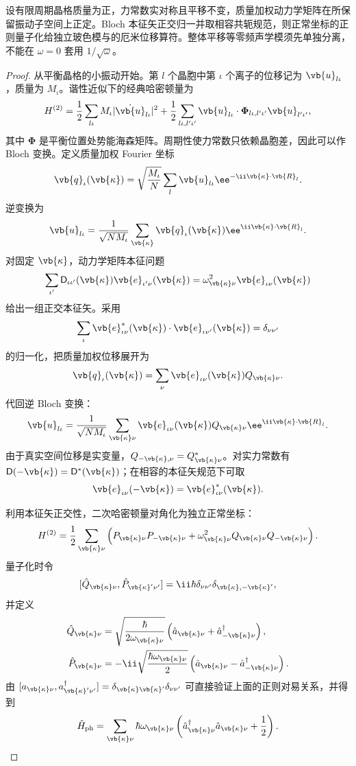 \begin{theorem}[周期谐性格的正交正常模量子化]
设有限周期晶格质量为正，力常数实对称且平移不变，质量加权动力学矩阵在所保留振动子空间上正定。Bloch 本征矢正交归一并取相容共轭规范，则正常坐标的正则量子化给独立玻色模与的厄米位移算符。整体平移等零频声学模须先单独分离，不能在 $\omega=0$ 套用 $1/\sqrt\omega$。
\end{theorem}
\begin{proof}
从平衡晶格的小振动开始。第 $l$ 个晶胞中第 $\iota$ 个离子的位移记为 $\vb{u}_{l\iota}$，质量为 $M_\iota$。谐性近似下的经典哈密顿量为
\[
H^{(2)}
=\frac12\sum_{l\iota}M_\iota|\dot{\vb{u}}_{l\iota}|^2
+\frac12\sum_{l\iota,l'\iota'}
\vb{u}_{l\iota}\cdot
\boldsymbol\Phi_{l\iota,l'\iota'}\vb{u}_{l'\iota'},
\]
其中 $\boldsymbol\Phi$ 是平衡位置处势能海森矩阵。周期性使力常数只依赖晶胞差，因此可以作 Bloch 变换。定义质量加权 Fourier 坐标
\[
\vb{q}_\iota(\vb{\kappa})
=\sqrt{\frac{M_\iota}{N}}
\sum_l\vb{u}_{l\iota}\ee^{-\ii\vb{\kappa}\cdot\vb{R}_l}.
\]
逆变换为
\[
\vb{u}_{l\iota}
=\frac1{\sqrt{NM_\iota}}
\sum_{\vb{\kappa}}
\vb{q}_\iota(\vb{\kappa})
\ee^{\ii\vb{\kappa}\cdot\vb{R}_l}.
\]
对固定 $\vb{\kappa}$，动力学矩阵本征问题
\[
\sum_{\iota'}\mathsf D_{\iota\iota'}(\vb{\kappa})
\vb{e}_{\iota'\nu}(\vb{\kappa})
=\omega_{\vb{\kappa}\nu}^2
\vb{e}_{\iota\nu}(\vb{\kappa})
\]
给出一组正交本征矢。采用
\[
\sum_\iota
\vb{e}_{\iota\nu}^*(\vb{\kappa})\cdot
\vb{e}_{\iota\nu'}(\vb{\kappa})
=\delta_{\nu\nu'}
\]
的归一化，把质量加权位移展开为
\[
\vb{q}_\iota(\vb{\kappa})
=\sum_\nu\vb{e}_{\iota\nu}(\vb{\kappa})
Q_{\vb{\kappa}\nu}.
\]
代回逆 Bloch 变换：
\[
\vb{u}_{l\iota}
=\frac1{\sqrt{NM_\iota}}
\sum_{\vb{\kappa}\nu}
\vb{e}_{\iota\nu}(\vb{\kappa})
Q_{\vb{\kappa}\nu}
\ee^{\ii\vb{\kappa}\cdot\vb{R}_l}.
\]
由于真实空间位移是实变量，$Q_{-\vb{\kappa},\nu}=Q_{\vb{\kappa}\nu}^*$。对实力常数有 $\mathsf D(-\vb{\kappa})=\mathsf D^*(\vb{\kappa})$；在相容的本征矢规范下可取
\[
\vb{e}_{\iota\nu}(-\vb{\kappa})
=\vb{e}_{\iota\nu}^*(\vb{\kappa}).
\]

利用本征矢正交性，二次哈密顿量对角化为独立正常坐标：
\[
H^{(2)}
=\frac12\sum_{\vb{\kappa}\nu}
\left(P_{\vb{\kappa}\nu}P_{-\vb{\kappa}\nu}
+\omega_{\vb{\kappa}\nu}^2
Q_{\vb{\kappa}\nu}Q_{-\vb{\kappa}\nu}\right).
\]
量子化时令
\[
[\hat Q_{\vb{\kappa}\nu},
\hat P_{\vb{\kappa}'\nu'}]
=\ii\hbar\delta_{\nu\nu'}
\delta_{\vb{\kappa},-\vb{\kappa}'},
\]
并定义
\begin{align*}
\hat Q_{\vb{\kappa}\nu}
&=\sqrt{\frac{\hbar}{2\omega_{\vb{\kappa}\nu}}}
\left(\hat a_{\vb{\kappa}\nu}
+\hat a_{-\vb{\kappa}\nu}^\dagger\right),\\
\hat P_{\vb{\kappa}\nu}
&=-\ii\sqrt{\frac{\hbar\omega_{\vb{\kappa}\nu}}2}
\left(\hat a_{\vb{\kappa}\nu}
-\hat a_{-\vb{\kappa}\nu}^\dagger\right).
\end{align*}
由 $[a_{\vb{\kappa}\nu},a_{\vb{\kappa}'\nu'}^\dagger]
=\delta_{\vb{\kappa}\vb{\kappa}'}\delta_{\nu\nu'}$ 可直接验证上面的正则对易关系，并得到
\[
\hat H_{\rm ph}
=\sum_{\vb{\kappa}\nu}
\hbar\omega_{\vb{\kappa}\nu}
\left(\hat a_{\vb{\kappa}\nu}^\dagger
\hat a_{\vb{\kappa}\nu}+\frac12\right).
\]


\end{proof}
